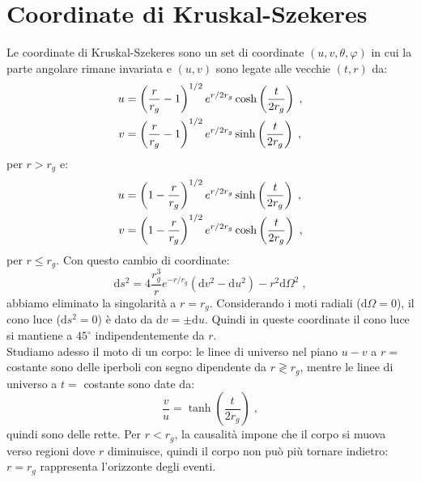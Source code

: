 \documentclass[12pt,a4paper]{report}
\theoremstyle{definition}
\newcommand{\diff}[1][]{\mathrm{d}#1}
\begin{document}
\section{Coordinate di Kruskal-Szekeres}
Le coordinate di Kruskal-Szekeres sono un set di coordinate $(u,v,\theta,\varphi)$ in cui la parte angolare rimane invariata e $(u,v)$ sono legate alle vecchie $(t,r)$ da:
\begin{align}
u &= \left(\frac{r}{r_g}-1\right)^{1/2}e^{r/2r_g}\cosh\left(\frac{t}{2r_g}\right)\;, \notag \\
v &= \left(\frac{r}{r_g}-1\right)^{1/2}e^{r/2r_g}\sinh\left(\frac{t}{2r_g}\right)\;,
\end{align}
per $r>r_g$ e:
\begin{align}
u &= \left(1-\frac{r}{r_g}\right)^{1/2}e^{r/2r_g}\sinh\left(\frac{t}{2r_g}\right)\;, \notag \\
v &= \left(1-\frac{r}{r_g}\right)^{1/2}e^{r/2r_g}\cosh\left(\frac{t}{2r_g}\right)\;,
\end{align}
per $r\le r_g$. Con questo cambio di coordinate:
\begin{equation}
\diff{s}^2=4\frac{r_g^3}{r}e^{-r/r_g}(\diff{v}^2-\diff{u}^2)-r^2\diff{\Omega}^2\;,
\end{equation}
abbiamo eliminato la singolarità a $r=r_g$. Considerando i moti radiali ($\diff{\Omega}=0$), il cono luce ($\diff{s}^2=0$) è dato da $\diff{v}=\pm\diff{u}$. Quindi in queste coordinate il cono luce si mantiene a $45^{\circ}$ indipendentemente da $r$. \\
Studiamo adesso il moto di un corpo: le linee di universo nel piano $u-v$ a $r=$ costante sono delle iperboli con segno dipendente da $r\gtrless r_g$, mentre le linee di universo a $t=$ costante sono date da:
$$
\frac{v}{u}=\tanh\left(\frac{t}{2r_g}\right)\;,
$$
quindi sono delle rette. Per $r<r_g$, la causalità impone che il corpo si muova verso regioni dove $r$ diminuisce, quindi il corpo non può più tornare indietro: $r=r_g$ rappresenta l'orizzonte degli eventi.
\end{document}
